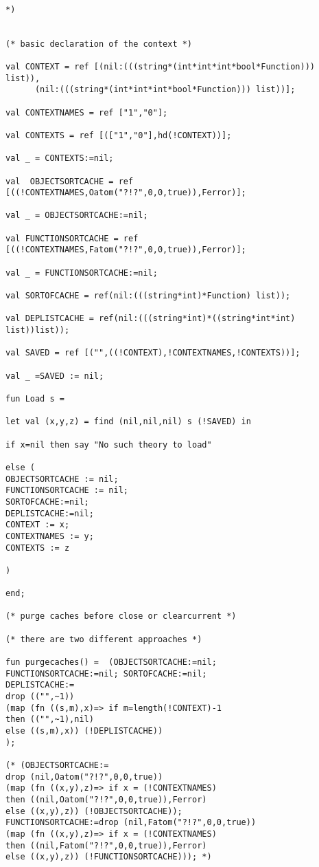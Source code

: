 \documentclass[12pt]{article}
\begin{document}
\begin{verbatim}

*)


(* basic declaration of the context *)

val CONTEXT = ref [(nil:(((string*(int*int*int*bool*Function))) list)),
      (nil:(((string*(int*int*int*bool*Function))) list))];

val CONTEXTNAMES = ref ["1","0"];

val CONTEXTS = ref [(["1","0"],hd(!CONTEXT))];

val _ = CONTEXTS:=nil;

val  OBJECTSORTCACHE = ref [((!CONTEXTNAMES,Oatom("?!?",0,0,true)),Ferror)];

val _ = OBJECTSORTCACHE:=nil;

val FUNCTIONSORTCACHE = ref [((!CONTEXTNAMES,Fatom("?!?",0,0,true)),Ferror)];

val _ = FUNCTIONSORTCACHE:=nil;

val SORTOFCACHE = ref(nil:(((string*int)*Function) list));

val DEPLISTCACHE = ref(nil:(((string*int)*((string*int*int) list))list));

val SAVED = ref [("",((!CONTEXT),!CONTEXTNAMES,!CONTEXTS))];

val _ =SAVED := nil;

fun Load s = 

let val (x,y,z) = find (nil,nil,nil) s (!SAVED) in

if x=nil then say "No such theory to load"

else (
OBJECTSORTCACHE := nil;
FUNCTIONSORTCACHE := nil;
SORTOFCACHE:=nil;
DEPLISTCACHE:=nil;
CONTEXT := x;
CONTEXTNAMES := y;
CONTEXTS := z

)

end;

(* purge caches before close or clearcurrent *)

(* there are two different approaches *)

fun purgecaches() =  (OBJECTSORTCACHE:=nil;
FUNCTIONSORTCACHE:=nil; SORTOFCACHE:=nil; 
DEPLISTCACHE:=
drop (("",~1)) 
(map (fn ((s,m),x)=> if m=length(!CONTEXT)-1
then (("",~1),nil) 
else ((s,m),x)) (!DEPLISTCACHE))
); 

(* (OBJECTSORTCACHE:=
drop (nil,Oatom("?!?",0,0,true)) 
(map (fn ((x,y),z)=> if x = (!CONTEXTNAMES) 
then ((nil,Oatom("?!?",0,0,true)),Ferror) 
else ((x,y),z)) (!OBJECTSORTCACHE));
FUNCTIONSORTCACHE:=drop (nil,Fatom("?!?",0,0,true)) 
(map (fn ((x,y),z)=> if x = (!CONTEXTNAMES) 
then ((nil,Fatom("?!?",0,0,true)),Ferror) 
else ((x,y),z)) (!FUNCTIONSORTCACHE))); *)


\end{verbatim}
\end{document}
